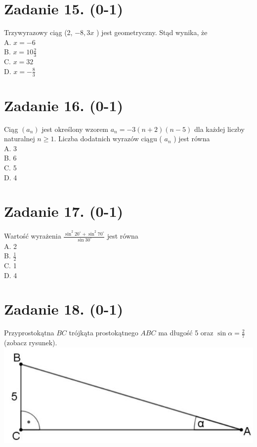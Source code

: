 \documentclass[10pt]{article}
\begin{document}
\section*{Zadanie 15. (0-1)}
Trzywyrazowy ciąg (2, \(-8,3 x\) ) jest geometryczny. Stąd wynika, że\\
A. \(x=-6\)\\
B. \(x=10 \frac{2}{3}\)\\
C. \(x=32\)\\
D. \(x=-\frac{8}{3}\)

\section*{Zadanie 16. (0-1)}
Ciąg \(\left(a_{n}\right)\) jest określony wzorem \(a_{n}=-3(n+2)(n-5)\) dla każdej liczby naturalnej \(n \geq 1\). Liczba dodatnich wyrazów ciągu ( \(a_{n}\) ) jest równa\\
A. 3\\
B. 6\\
C. 5\\
D. 4

\section*{Zadanie 17. (0-1)}
Wartość wyrażenia \(\frac{\sin ^{2} 20^{\circ}+\sin ^{2} 70^{\circ}}{\sin 30^{\circ}}\) jest równa\\
A. 2\\
B. \(\frac{1}{2}\)\\
C. 1\\
D. 4

\section*{Zadanie 18. (0-1)}
Przyprostokątna \(B C\) trójkąta prostokątnego \(A B C\) ma długość 5 oraz \(\sin \alpha=\frac{2}{7}\) (zobacz rysunek).\\
\includegraphics[max width=\textwidth, center]{2024_11_21_fd555512e32c497e8a5dg-08}
\end{document}
